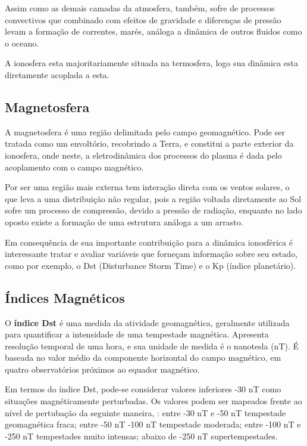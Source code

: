 Assim como as demais camadas da atmosfera, também, sofre de processos convectivos que combinado com efeitos de gravidade e diferenças de pressão levam a formação de correntes, marés, análoga a dinâmica de outros fluidos como o oceano.

A ionosfera esta majoritariamente situada na termosfera, logo sua dinâmica esta diretamente acoplada a esta.

\subsection{Magnetosfera}

A magnetosfera é uma região delimitada pelo campo geomagnético. Pode ser tratada como um envoltório, recobrindo a Terra, e constitui a parte exterior da ionosfera, onde neste, a eletrodinâmica dos processos do plasma é dada pelo acoplamento com o campo magnético.

Por ser uma região mais externa tem interação direta com os ventos solares, o que leva  a uma distribuição não regular, pois a região voltada diretamente ao Sol sofre um processo de compressão, devido a pressão de radiação, enquanto no lado oposto existe a formação de uma estrutura análoga a um arrasto.

Em consequência de sua importante contribuição para a dinâmica ionosférica é interessante tratar e avaliar variáveis que forneçam informação sobre seu estado, como por exemplo, o Dst (Disturbance Storm Time) e o Kp (índice planetário).

\subsection{Índices Magnéticos}

O {\bf índice Dst} é uma medida da atividade geomagnética, geralmente utilizada para quantificar a intensidade de uma tempestade magnética. Apresenta resolução temporal de uma hora, e sua unidade de medida é o nanotesla (nT). É baseada no valor médio da componente horizontal do campo magnético, em quatro observatórios próximos ao equador magnético.

Em termos do índice Dst, pode-se considerar valores inferiores -30 nT como situações magnéticamente perturbadas. Os valores podem ser mapeados frente ao nível de pertubação da seguinte maneira, \cite{GONZALEZ:1994}: entre -30 nT e -50 nT tempestade geomagnética fraca; entre -50 nT -100 nT tempestade moderada; entre -100 nT e -250 nT tempestades muito intensas; abaixo de -250 nT supertempestades.

